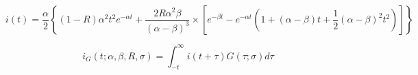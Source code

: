 \begin{equation}
i(t) = \frac{\alpha}{2}
\left \{
(1-R) \alpha^2 t^2 e^{-\alpha t}
+ \frac{2 R\alpha^2 \beta}{(\alpha-\beta)^3}
\times
\left [
  e^{-\beta t}  - e^{-\alpha t} ( 1 + (\alpha-\beta)t + \frac{1}{2}(\alpha-\beta)^2 t^2  )
  \right ]
\right \}
\end{equation}


\begin{equation}
  i_{G}(t; \alpha,\beta,R,\sigma) = \int_{-t}^{\infty} i(t+\tau) G(\tau; \sigma) d\tau
\end{equation}
